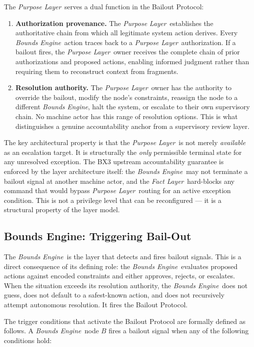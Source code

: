 \documentclass[12pt]{article}
\newcommand{\purpose}{\textit{Purpose Layer}}
\newcommand{\bounds}{\textit{Bounds Engine}}
\newcommand{\fact}{\textit{Fact Layer}}
\begin{document}
The \purpose\ serves a dual function in the Bailout Protocol:

\begin{enumerate}
\item \textbf{Authorization provenance.} The \purpose\ establishes the authoritative chain from which all legitimate system action derives. Every \bounds\ action traces back to a \purpose\ authorization. If a bailout fires, the \purpose\ owner receives the complete chain of prior authorizations and proposed actions, enabling informed judgment rather than requiring them to reconstruct context from fragments.
\item \textbf{Resolution authority.} The \purpose\ owner has the authority to override the bailout, modify the node's constraints, reassign the node to a different \bounds, halt the system, or escalate to their own supervisory chain. No machine actor has this range of resolution options. This is what distinguishes a genuine accountability anchor from a supervisory review layer.
\end{enumerate}

The key architectural property is that the \purpose\ is not merely \textit{available} as an escalation target. It is structurally the \textit{only} permissible terminal state for any unresolved exception. The BX3 upstream accountability guarantee is enforced by the layer architecture itself: the \bounds\ may not terminate a bailout signal at another machine actor, and the \fact\ hard-blocks any command that would bypass \purpose\ routing for an active exception condition. This is not a privilege level that can be reconfigured --- it is a structural property of the layer model.

\subsection{Bounds Engine: Triggering Bail-Out}
\label{sec:bounds-trigger}

The \bounds\ is the layer that detects and fires bailout signals. This is a direct consequence of its defining role: the \bounds\ evaluates proposed actions against encoded constraints and either approves, rejects, or escalates. When the situation exceeds its resolution authority, the \bounds\ does not guess, does not default to a safest-known action, and does not recursively attempt autonomous resolution. It fires the Bailout Protocol.

The trigger conditions that activate the Bailout Protocol are formally defined as follows. A \bounds\ node $B$ fires a bailout signal when any of the following conditions hold:
\end{document}
